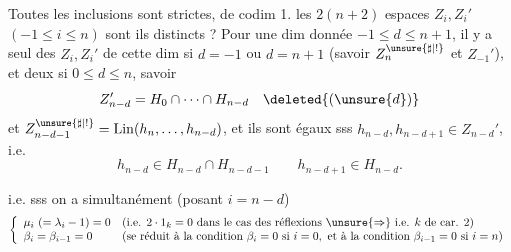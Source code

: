 
Toutes les inclusions  sont strictes, de codim 1.
 les $2(n+2)$ espaces $Z_i,Z_i'$ $(-1\leq i\leq n)$ sont ils distincts ? Pour une dim donnée $-1\leq d\leq n+1$, il y a   seul des $Z_i,Z_i'$ de cette dim si $d=-1$ ou $d=n+1$ (savoir $Z_n^{\unsure{\sharp|!}}$ et $Z_{-1}'$), et  deux si $0\leq d\leq n$, savoir
\[
Z_{n-d}'=H_0\cap\cdots\cap H_{n-d}
\quad\deleted{(\unsure{d})}
\]
et $Z_{n-d-1}^{\unsure{\sharp|!}}=\operatorname{Lin}(h_n,\ldots,h_{n-d})$, et ils  sont  égaux sss $h_{n-d},h_{n-d+1}\in Z_{n-d}'$, i.e.
\[
h_{n-d}\in H_{n-d}\cap H_{n-d-1}
\qquad
h_{n-d+1}\in H_{n-d}.
\]



i.e. sss on a simultanément (posant $i=n-d$)
\[
\left\{
\begin{array}{ll}
\mu_i\ (= \lambda_i-1)=0&
\text{(i.e. }2\cdot1_k=0\text{ dans le cas des réflexions }\unsure{\Rightarrow}\text{ i.e. }k\text{ de car. }2)\\
\beta_i=\beta_{i-1}=0&
\text{(se réduit à la condition }\beta_i=0\text{ si }i=0,\text{ et à la condition }\beta_{i-1}=0\text{ si }i=n)
\end{array}\right.
\]


